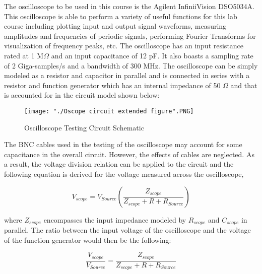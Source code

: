 \documentclass[a4paper,10pt]{article}
\begin{document}
The oscilloscope to be used in this course is the Agilent InfiniiVision DSO5034A. This oscilloscope is able to perform a variety of useful functions for this lab course including plotting input and output signal waveforms, measuring amplitudes and frequencies of periodic signals, performing Fourier Transforms for visualization of frequency peaks, etc. The oscilloscope has an input resistance rated at 1 M$\Omega$ and an input capacitance of 12 pF. It also boasts a sampling rate of 2 Giga-samples/s and a bandwidth of 300 MHz. The oscilloscope can be simply modeled as a resistor and capacitor in parallel and is connected in series with a resistor and function generator which has an internal impedance of 50 $\Omega$ and that is accounted for in the circuit model shown below: 

\begin{figure}[h!]
	\centering
	\texttt{[image: "./Oscope circuit extended figure".PNG]}
	\caption{Oscilloscope Testing Circuit Schematic}
	\label{fig:scope_circuit}
\end{figure}


The BNC cables used in the testing of the oscilloscope may account for some capacitance in the overall circuit. However, the effects of cables are neglected. As a result, the voltage division relation can be applied to the circuit and the following equation is derived for the voltage measured across the oscilloscope,

\begin{equation}
	\label{eq:vscope}
	V_{scope} = V_{Source}(\frac{Z_{scope}}{Z_{scope} + R + R_{Source}}) 
\end{equation}
	
where $Z_{scope}$ encompasses the input impedance modeled by $R_{scope}$ and $C_{scope}$ in parallel. The ratio between the input voltage of the oscilloscope and the voltage of the function generator would then be the following:

\begin{equation}
	\label{eq:osc_ratio}
	\frac{V_{scope}}{V_{Source}} = \frac{Z_{scope}}{Z_{scope} + R + R_{Source}} 
\end{equation}
	
	
	
	
	
\end{document}
